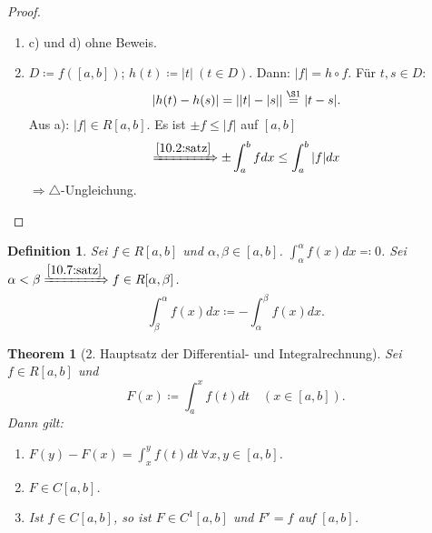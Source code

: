 \documentclass[14pt,titlepage,ngerman,a4paper,headsepline,DIV15,halfparskip*]{scrartcl}
\theoremstyle{named}
\newtheorem{namedtheorem}{Theorem} \counterwithin{namedtheorem}{section}
\theoremstyle{dotless}
\newtheorem*{definition}{Definition}
\begin{document}
\begin{proof} ~\
	\begin{enumerate}
		\item c) und d) ohne Beweis.
		\item $D \coloneqq f([a, b])$; $h(t) \coloneqq |t| ~(t \in D)$. Dann: $|f| = h \circ f$. Für $t, s \in D$: 
			$$ |h(t) - h(s)| = \left| |t| - |s| \right| \overset{\S 1}{=} |t - s|. $$
			Aus a): $|f| \in R[a, b]$. Es ist $\pm f \leq |f|$ auf $[a, b]$
			$$ \xRightarrow[]{\ref{10.2:satz}} \pm \int_{a}^{b} f dx \leq \int_{a}^{b} |f| dx$$
			$\Rightarrow \triangle$-Ungleichung.
	\end{enumerate}
\end{proof}


\begin{definition}
	Sei $f \in R[a, b]$ und $\alpha, \beta \in [a, b]$. $\int_{\alpha}^{\alpha} f(x) dx \eqqcolon 0$. Sei $\alpha < \beta \xRightarrow[]{\ref{10.7:satz}} f \in R[\alpha, \beta]$.
	$$ \int_{\beta}^{\alpha} f(x) dx \coloneqq - \int_{\alpha}^{\beta} f(x) dx. $$
\end{definition}

\begin{namedtheorem}[2. Hauptsatz der Differential- und Integralrechnung]\label{10.11:2Hauptsatz}
	Sei $f \in R[a, b]$ und
	$$ F(x) \coloneqq \int_{a}^{x} f(t) dt \quad \left( x \in [a, b] \right). $$
	Dann gilt:
	\begin{enumerate}
		\item $F(y) - F(x) = \int_{x}^{y} f(t) dt ~\forall x, y \in [a, b]$.
		\item $F \in C[a, b]$.
		\item Ist $f \in C[a, b]$, so ist $F \in C^{1}[a, b]$ und $F' = f$ auf $[a, b]$.
	\end{enumerate}
\end{namedtheorem}
\end{document}

